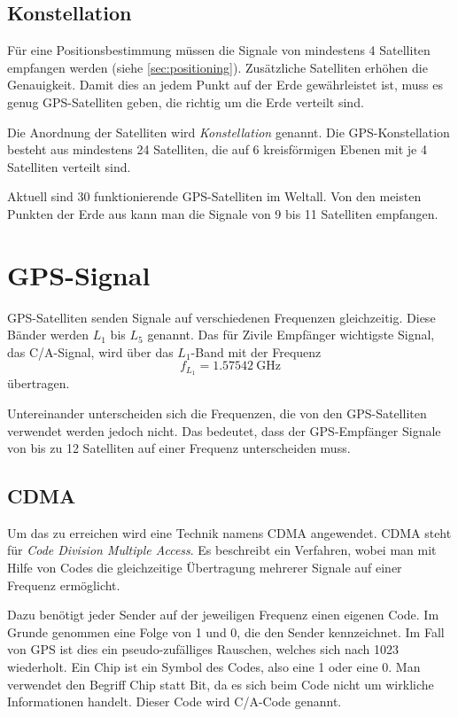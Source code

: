 \documentclass[12pt,a4paper]{scrartcl}
\begin{document}
\subsection{Konstellation}
Für eine Positionsbestimmung müssen die Signale von mindestens 4 Satelliten empfangen werden (siehe \ref{sec:positioning}). Zusätzliche Satelliten erhöhen die Genauigkeit. Damit dies an jedem Punkt auf der Erde gewährleistet ist, muss es genug GPS-Satelliten geben, die richtig um die Erde verteilt sind.

Die Anordnung der Satelliten wird \emph{Konstellation} genannt. Die GPS-Konstellation besteht aus mindestens 24 Satelliten, die auf 6 kreisförmigen Ebenen mit je 4 Satelliten verteilt sind.

Aktuell sind 30 funktionierende GPS-Satelliten im Weltall. Von den meisten Punkten der Erde aus kann man die Signale von 9 bis 11 Satelliten empfangen.

\section{GPS-Signal}
GPS-Satelliten senden Signale auf verschiedenen Frequenzen gleichzeitig. Diese Bänder werden $L_1$ bis $L_5$ genannt. Das für Zivile Empfänger wichtigste Signal, das C/A-Signal, wird über das $L_1$-Band mit der Frequenz
\begin{equation}
f_{L_1} = \SI{1.57542}{\giga\hertz} \nonumber
\end{equation}
übertragen.

Untereinander unterscheiden sich die Frequenzen, die von den GPS-Satelliten verwendet werden jedoch nicht. Das bedeutet, dass der GPS-Empfänger Signale von bis zu 12 Satelliten auf einer Frequenz unterscheiden muss.

\subsection{CDMA}

Um das zu erreichen wird eine Technik namens CDMA angewendet.
CDMA steht für \emph{Code Division Multiple Access}. Es beschreibt ein Verfahren, wobei man mit Hilfe von Codes die gleichzeitige Übertragung mehrerer Signale auf einer Frequenz ermöglicht.

Dazu benötigt jeder Sender auf der jeweiligen Frequenz einen eigenen Code. Im Grunde genommen eine Folge von 1 und 0, die den Sender kennzeichnet. Im Fall von GPS ist dies ein pseudo-zufälliges Rauschen, welches sich nach \SI{1023}{\chip} wiederholt. Ein Chip ist ein Symbol des Codes, also eine 1 oder eine 0. Man verwendet den Begriff Chip statt Bit, da es sich beim Code nicht um wirkliche Informationen handelt. Dieser Code wird C/A-Code genannt.
\end{document}
